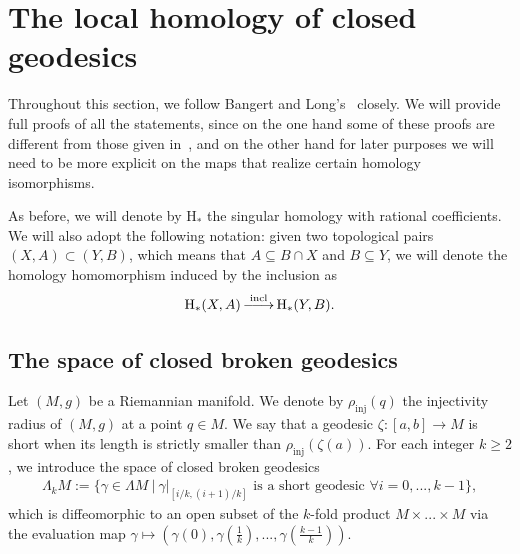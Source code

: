 \documentclass[reqno]{amsart}
\numberwithin{equation}{section}
\theoremstyle{personal}%
\theoremstyle{definition}
\newcommand{\incl}{\mathrm{incl}}
\newcommand{\Hom}{\mathrm{H}}
\DeclareRobustCommand{\llongrightarrow}{\relbar\joinrel\relbar\joinrel\rightarrow}
\DeclareMathOperator*{\ttoup}{\llongrightarrow}
\begin{document}
\section{The local homology of closed geodesics}
\label{s:local_homology}

Throughout this section, we follow Bangert and Long's~\cite[Section~3]{Bangert:2010ak} closely. We will provide full proofs of all the statements, since on the one hand some of these proofs are different from those given in~\cite[Section~3]{Bangert:2010ak}, and on the other hand  for later purposes we will need to be more explicit on the maps that realize certain homology isomorphisms. 

As before, we will  denote by $\Hom_*$ the singular homology with rational coefficients. We will also adopt the following notation: given two topological pairs $(X,A)\subset(Y,B)$, which means that $A\subseteq B\cap X$ and $B\subseteq Y$, we will denote the homology homomorphism induced by the inclusion as
\begin{align*}
\Hom_*(X,A)\ttoup^{\incl} \Hom_*(Y,B).
\end{align*}

\subsection{The space of closed broken geodesics}

Let $(M,g)$ be a Riemannian manifold. We denote by $\rho_{\mathrm{inj}}(q)$ the injectivity radius of $(M,g)$ at a point $q\in M$. We say that a geodesic $\zeta:[a,b]\to M$ is short when its length is strictly smaller than $\rho_{\mathrm{inj}}(\zeta(a))$. For each integer $k\geq2$, we introduce the space of closed broken geodesics
\begin{align*}
\Lambda_kM:=\big\{\gamma\in\Lambda M \ \big|\ \gamma|_{[i/k,(i+1)/k]} \mbox{ is a short geodesic } \forall i=0,...,k-1\big\},
\end{align*}
which is diffeomorphic to an open subset of the $k$-fold product $M\times...\times M$ via the evaluation map $\gamma\mapsto(\gamma(0),\gamma(\tfrac 1k),...,\gamma(\tfrac{k-1}{k}))$.
\end{document}

